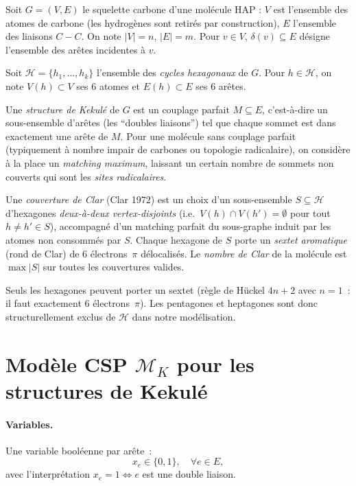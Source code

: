\documentclass[a4paper,11pt]{article}
\begin{document}
Soit $G = (V, E)$ le squelette carbone d'une mol\'ecule HAP : $V$ est l'ensemble des atomes de
carbone (les hydrog\`enes sont retir\'es par construction), $E$ l'ensemble des liaisons $C\!-\!C$.
On note $|V| = n$, $|E| = m$. Pour $v \in V$, $\delta(v) \subseteq E$ d\'esigne l'ensemble des
ar\^etes incidentes \`a $v$.

Soit $\mathcal{H} = \{h_1, \dots, h_k\}$ l'ensemble des \emph{cycles hexagonaux} de $G$. Pour
$h \in \mathcal{H}$, on note $V(h) \subset V$ ses 6 atomes et $E(h) \subset E$ ses 6 ar\^etes.

\begin{definition}
Une \emph{structure de Kekul\'e} de $G$ est un couplage parfait $M \subseteq E$, c'est-\`a-dire
un sous-ensemble d'ar\^etes (les ``doubles liaisons'') tel que chaque sommet est dans exactement
une ar\^ete de $M$. Pour une mol\'ecule sans couplage parfait (typiquement \`a nombre impair de
carbones ou topologie radicalaire), on consid\`ere \`a la place un \emph{matching maximum},
laissant un certain nombre de sommets non couverts qui sont les \emph{sites radicalaires}.
\end{definition}

\begin{definition}
Une \emph{couverture de Clar} (Clar 1972) est un choix d'un sous-ensemble $S \subseteq \mathcal{H}$
d'hexagones \emph{deux-\`a-deux vertex-disjoints} (i.e.\ $V(h) \cap V(h') = \emptyset$ pour tout
$h \neq h' \in S$), accompagn\'e d'un matching parfait du sous-graphe induit par les atomes non
consomm\'es par $S$. Chaque hexagone de $S$ porte un \emph{sextet aromatique} (rond de Clar)
de 6 \'electrons~$\pi$ d\'elocalis\'es. Le \emph{nombre de Clar} de la mol\'ecule est
$\max |S|$ sur toutes les couvertures valides.
\end{definition}

Seuls les hexagones peuvent porter un sextet (r\`egle de H\"uckel $4n+2$ avec $n=1$~: il faut
exactement 6 \'electrons~$\pi$). Les pentagones et heptagones sont donc structurellement exclus
de $\mathcal{H}$ dans notre mod\'elisation.

\section{Mod\`ele CSP $\mathcal{M}_K$ pour les structures de Kekul\'e}

\paragraph{Variables.} Une variable bool\'eenne par ar\^ete~:
\[
  x_e \in \{0, 1\}, \quad \forall e \in E,
\]
avec l'interpr\'etation $x_e = 1 \iff e$ est une double liaison.
\end{document}
